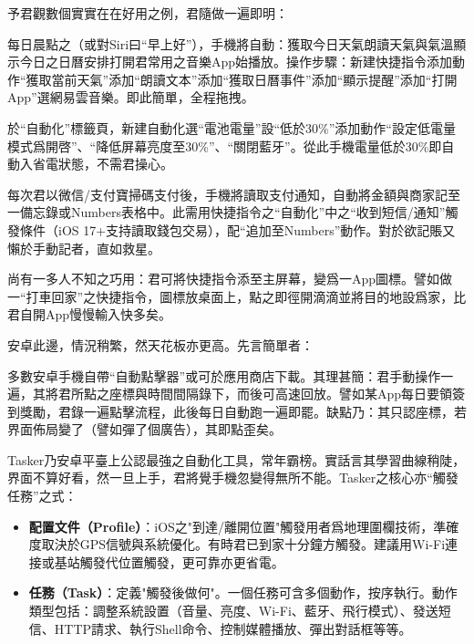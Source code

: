 予君觀數個實實在在好用之例，君隨做一遍即明：


每日晨點之（或對Siri曰“早上好”），手機將自動：獲取今日天氣朗讀天氣與氣溫顯示今日之日曆安排打開君常用之音樂App始播放。操作步驟：新建快捷指令添加動作“獲取當前天氣”添加“朗讀文本”添加“獲取日曆事件”添加“顯示提醒”添加“打開App”選網易雲音樂。即此簡單，全程拖拽。


於“自動化”標籤頁，新建自動化選“電池電量”設“低於30\%”添加動作“設定低電量模式爲開啓”、“降低屏幕亮度至30\%”、“關閉藍牙”。從此手機電量低於30\%即自動入省電狀態，不需君操心。


每次君以微信/支付寶掃碼支付後，手機將讀取支付通知，自動將金額與商家記至一備忘錄或Numbers表格中。此需用快捷指令之“自動化”中之“收到短信/通知”觸發條件（iOS 17+支持讀取錢包交易），配“追加至Numbers”動作。對於欲記賬又懶於手動記者，直如救星。

尚有一多人不知之巧用：君可將快捷指令添至主屏幕，變爲一App圖標。譬如做一“打車回家”之快捷指令，圖標放桌面上，點之即徑開滴滴並將目的地設爲家，比君自開App慢慢輸入快多矣。


安卓此邊，情況稍繁，然天花板亦更高。先言簡單者：


多數安卓手機自帶“自動點擊器”或可於應用商店下載。其理甚簡：君手動操作一遍，其將君所點之座標與時間間隔錄下，而後可高速回放。譬如某App每日要領簽到獎勵，君錄一遍點擊流程，此後每日自動跑一遍即罷。缺點乃：其只認座標，若界面佈局變了（譬如彈了個廣告），其即點歪矣。


Tasker乃安卓平臺上公認最強之自動化工具，常年霸榜。實話言其學習曲線稍陡，界面不算好看，然一旦上手，君將覺手機忽變得無所不能。Tasker之核心亦“觸發任務”之式：

\begin{itemize}
  \item \textbf{配置文件（Profile）}：iOS之"到達/離開位置"觸發用者爲地理圍欄技術，準確度取決於GPS信號與系統優化。有時君已到家十分鐘方觸發。建議用Wi-Fi連接或基站觸發代位置觸發，更可靠亦更省電。
  \item \textbf{任務（Task）}：定義"觸發後做何"。一個任務可含多個動作，按序執行。動作類型包括：調整系統設置（音量、亮度、Wi-Fi、藍牙、飛行模式）、發送短信、HTTP請求、執行Shell命令、控制媒體播放、彈出對話框等等。
\end{itemize}

